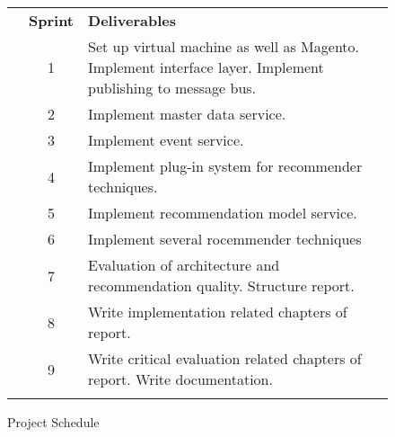 \begin{figure}[ht]
    \footnotesize
    \begin{tabularx}{\textwidth}{
        !{\vrule width 1pt} c !{\vrule width 1pt} c !{\vrule width 1pt} X !{\vrule width 1pt}
    }
        & \textbf{Sprint} & \textbf{Deliverables}\\

         & 1 & 
        Set up virtual machine as well as Magento.\newline
        Implement interface layer.\newline
        Implement publishing to message bus.
        \\

        & 2 & Implement master data service. \\

        & 3 & Implement event service. \\

        & 4 & Implement plug-in system for recommender techniques. \\

        & 5 & Implement recommendation model service. \\

        & 6 & Implement several rocemmender techniques \\

         & 7 & 
        Evaluation of architecture and recommendation quality.\newline
        Structure report. \\
        
        & 8 & Write implementation related chapters of report. \\

        & 9 & Write critical evaluation related chapters of report.\newline
        Write documentation.\\

    \end{tabularx}
    \caption{Project Schedule}
    \label{fig:schedule}
\end{figure}


